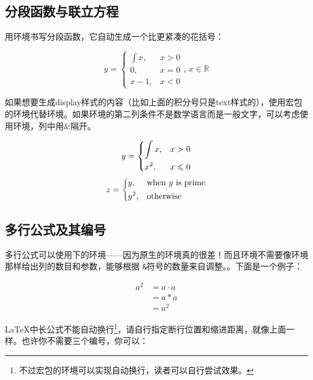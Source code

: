 \subsection{分段函数与联立方程}
用环境书写分段函数，它自动生成一个比更紧凑的花括号：

\begin{codeshow}
\[y=\begin{cases}
\int x, & x>0 \\
0,   & x=0 \\
x-1, & x<0
\end{cases},\,x\in\mathbb{R}\]
\end{codeshow}

如果想要生成display样式的内容（比如上面的积分号只是text样式的），使用宏包的环境代替环境。如果环境的第二列条件不是数学语言而是一般文字，可以考虑使用环境，列中用\&{}隔开。

\begin{codeshow}
\[y=\begin{dcases}
  \int x, & x>0 \\
  x^2, & x\leqslant 0
  \end{dcases}\]
\[z=\begin{dcases*}
  y, & when $y$ is prime\\
  y^2, & otherwise
  \end{dcases*}\]
\end{codeshow}

\subsection{多行公式及其编号}
\label{subsec:multieqnum}
多行公式可以使用下的环境——因为原生的环境真的很差！而且环境不需要像环境那样给出列的数目和参数，能够根据
\texttt{\&}符号的数量来自调整。。下面是一个例子：

\begin{codeshow}
\begin{align}
  a^2  &= a\cdot a \\
       &= a*a      \\
       &= a^2
\end{align}
\end{codeshow}

\LaTeX 中长公式不能自动换行\footnote{不过宏包的环境可以实现自动换行，读者可以自行尝试效果。}，请自行指定断行位置和缩进距离，就像上面一样。也许你不需要三个编号，你可以：


